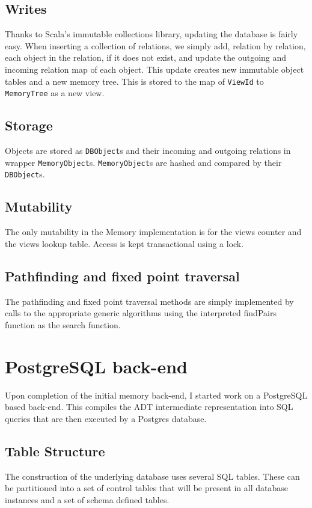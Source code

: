 \documentclass[12pt,a4paper,twoside,openright]{report}
\newcommand\codeName[1]{\texttt{#1}}
\begin{document}
	\subsection{Writes}
	Thanks to Scala's immutable collections library, updating the database is fairly easy. When inserting a collection of relations, we simply add, relation by relation, each object in the relation, if it does not exist, and update the outgoing and incoming relation map of each object. This update creates new immutable object tables and a new memory tree. This is stored to the map of \codeName{ViewId}  to \codeName{MemoryTree} as a new view.

	\subsection{Storage}
	Objects are stored as \codeName{DBObject}s and their incoming and outgoing relations in wrapper \codeName{MemoryObject}s. \codeName{MemoryObject}s  are hashed and compared by their \codeName{DBObject}s.
	
	\subsection{Mutability}
	The only mutability in the Memory implementation is for the views counter and the views lookup table. Access is kept transactional using a lock.

	\subsection{Pathfinding and fixed point traversal}
	The pathfinding and fixed point traversal methods are simply implemented by calls to the appropriate generic algorithms using the interpreted findPairs function as the search function.


\section{PostgreSQL back-end}
Upon completion of the initial memory back-end, I started work on a PostgreSQL based back-end. This compiles the ADT intermediate representation into SQL queries that are then executed by a Postgres database.

	\subsection{Table Structure}
	The construction of the underlying database uses several SQL tables. These can be partitioned into a set of control tables that will be present in all database instances and a set  of schema defined tables.
\end{document}
